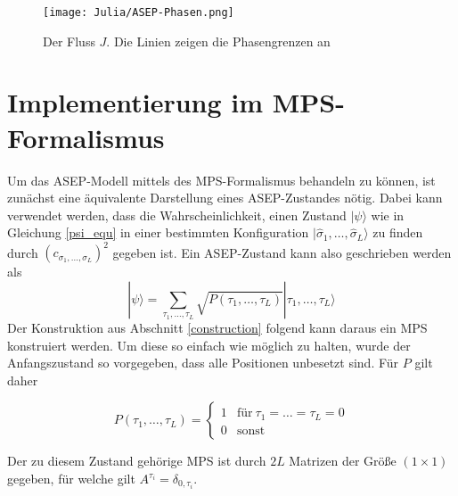 \documentclass[10pt,a4paper]{report}
\newcommand{\SumIndex}{\sigma_1,\ldots,\sigma_L}
\newcommand{\SumIndexTau}{\tau_1,\ldots,\tau_L}
\begin{document}
\begin{figure}
\begin{center}
\texttt{[image: Julia/ASEP-Phasen.png]}
\caption{Der Fluss $J$. Die Linien zeigen die Phasengrenzen an}
\end{center}
\end{figure}

 

\section{Implementierung im MPS-Formalismus}

Um das ASEP-Modell mittels des MPS-Formalismus behandeln zu können, ist zunächst eine äquivalente Darstellung eines ASEP-Zustandes nötig. Dabei kann verwendet werden, dass die Wahrscheinlichkeit, einen Zustand $|\psi\rangle$ wie in Gleichung \ref{psi_equ} in einer bestimmten Konfiguration $|\hat{\sigma}_1,\ldots,\hat{\sigma}_L\rangle$ zu finden durch $(c_{\SumIndex})^2$ gegeben ist. Ein ASEP-Zustand kann also geschrieben werden als
\begin{equation}
|\psi\rangle=\sum_{\SumIndexTau} \sqrt{P(\SumIndexTau)}|\SumIndexTau\rangle
\end{equation}
Der Konstruktion aus Abschnitt \ref{construction} folgend kann daraus ein MPS konstruiert werden. Um diese so einfach wie möglich zu halten, wurde der Anfangszustand so vorgegeben, dass alle Positionen unbesetzt sind. Für $P$ gilt daher

\begin{equation}
P(\tau_1,\ldots,\tau_L)=
\begin{cases}
1 & \text{für}\ \tau_1=\ldots=\tau_L=0\\
0 & \text{sonst}
\end{cases}
\end{equation}

Der zu diesem Zustand gehörige MPS ist durch $2L$ Matrizen der Größe $(1\times 1)$ gegeben, für welche gilt $A^{\tau_i}=\delta_{0,\tau_i}$. \par
\end{document}
